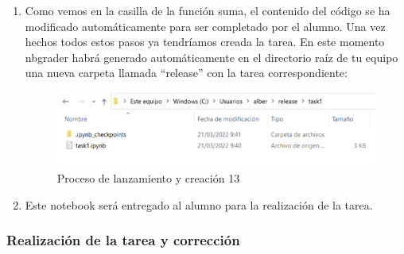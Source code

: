 \begin{enumerate}
\item Como vemos en la casilla de la función suma, el contenido del código se ha modificado automáticamente para ser completado por el alumno.
Una vez hechos todos estos pasos ya tendríamos creada la tarea. En este momento nbgrader habrá generado automáticamente en el directorio raíz de tu equipo una nueva carpeta llamada “release” con la tarea correspondiente:

\begin{figure}[H]
    \centering
    \includegraphics[width=1\textwidth]{img/prueba/prueba_13.png}
    \caption{Proceso de lanzamiento y creación 13}
\end{figure}

\item Este notebook será entregado al alumno para la realización de la tarea.

\end{enumerate}

\subsubsection{Realización de la tarea y corrección}


